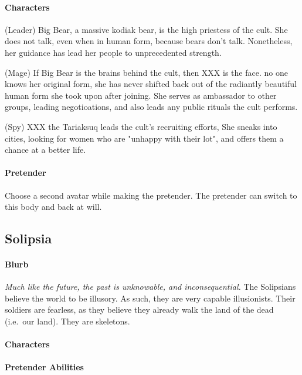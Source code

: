 \documentclass[12pt,letterpaper]{article}
\begin{document}
\paragraph{Characters}

(Leader) Big Bear, a massive kodiak bear, is the high priestess of the cult.
She does not talk, even when in human form, because bears don't talk.
Nonetheless, her guidance has lead her people to unprecedented strength.

(Mage) If Big Bear is the brains behind the cult, then XXX is the face.
no one knows her original form, she has never shifted back out of
the radiantly beautiful human form she took upon after joining.
She serves as ambassador to other groups, leading negotioations,
and also leads any public rituals the cult performs.

(Spy) XXX the Tariaksuq leads the cult's recruiting efforts,
She sneaks into cities, looking for women who are "unhappy with their lot",
and offers them a chance at a better life.

\paragraph{Pretender}

Choose a second avatar while making the pretender.
The pretender can switch to this body and back at will.

\subsection{Solipsia}
\paragraph{Blurb}

\emph{Much like the future, the past is unknowable, and inconsequential.}
The Solipsians believe the world to be illusory.
As such, they are very capable illusionists.
Their soldiers are fearless,
as they believe they already walk the land of the dead (i.e.\ our land).
They are skeletons.

\paragraph{Characters}

\paragraph{Pretender Abilities}
\end{document}
